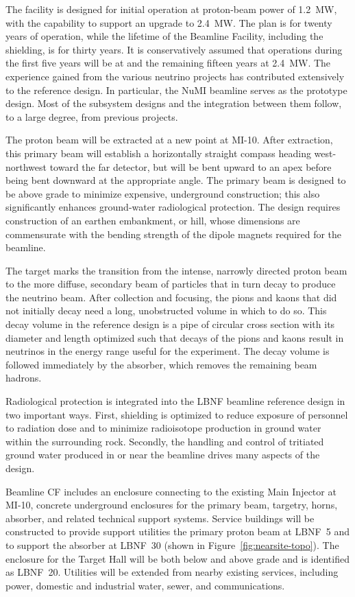 The facility is designed for initial operation at proton-beam power of \SI{1.2}{\MW}, with the capability to support an upgrade to \SI{2.4}{\MW}. The plan is for twenty years of operation, while the lifetime of the Beamline Facility, including the shielding, is for thirty years. It is conservatively assumed that operations during the first five years will be at  and the remaining fifteen years at \SI{2.4}{\MW}.  
The experience gained from the various neutrino projects has contributed extensively to the reference design. In particular, the NuMI beamline serves as the prototype design. Most of the subsystem designs and the integration between them follow, to a large degree, from previous projects. 

The proton beam will be extracted at a new point at MI-10. After extraction, this primary beam will establish a horizontally straight compass heading west-northwest toward the far detector, but will be bent upward to an apex before being bent downward at the appropriate angle. The primary beam is designed to be above grade to minimize expensive, underground construction; this also significantly enhances ground-water radiological protection. The design requires%
construction of an earthen embankment, or hill, whose dimensions are commensurate with the bending strength of the dipole magnets required for the beamline. 

The target marks the transition from the intense, narrowly directed proton beam to the more diffuse, secondary beam of particles that in turn decay to produce the neutrino beam. After collection and focusing, the pions and kaons that did not initially decay need a long, unobstructed volume in which to %
do so. This decay volume in the reference design is a pipe of circular cross section with its diameter and length optimized such that decays of the pions and kaons result in neutrinos in the energy range useful for the experiment. The decay volume is followed immediately by the absorber, which removes the remaining beam hadrons. 

Radiological protection is integrated into the LBNF beamline reference design in two important ways. First, shielding is optimized to reduce exposure of personnel to radiation dose and to minimize radioisotope production in ground water within the surrounding rock. Secondly, the handling and control of tritiated ground water produced in or near the beamline drives many aspects of the design. 

Beamline CF includes an enclosure connecting to the existing Main Injector at MI-10, concrete underground enclosures for the primary beam, targetry, horns, absorber, and related technical support systems. Service buildings will be constructed to provide support utilities the primary proton beam at LBNF~5 and to support the absorber at LBNF~30 (shown in Figure~\ref{fig:nearsite-topo}).  The enclosure for the Target Hall will be both below and above grade  and is identified as LBNF~20.  Utilities will be extended from nearby existing services, including power, domestic and industrial water, sewer, and communications. 

